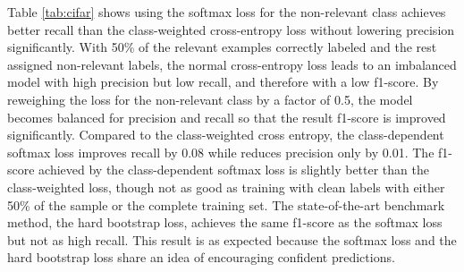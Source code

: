 Table \ref{tab:cifar} shows using the softmax loss for the non-relevant class achieves better recall than the class-weighted cross-entropy loss without lowering precision significantly.
With 50\% of the relevant examples correctly labeled and the rest assigned non-relevant labels, the normal cross-entropy loss leads to an imbalanced model with high precision but low recall, and therefore with a low f1-score.
By reweighing the loss for the non-relevant class by a factor of 0.5, the model becomes balanced for precision and recall so that the result f1-score is improved significantly.
Compared to the class-weighted cross entropy, the class-dependent softmax loss improves recall by 0.08 while reduces precision only by 0.01.
The f1-score achieved by the class-dependent softmax loss is slightly better than the class-weighted loss, though not as good as training with clean labels with either 50\% of the sample or the complete training set.
The state-of-the-art benchmark method, the hard bootstrap loss, achieves the same f1-score as the softmax loss but not as high recall.
This result is as expected because the softmax loss and the hard bootstrap loss share an idea of encouraging confident predictions.



